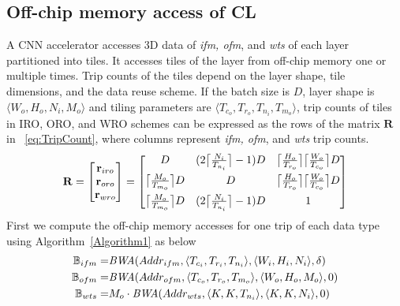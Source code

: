\subsection{Off-chip memory access of CL}\label{sec:AccessCLData}
A CNN accelerator accesses 3D data of \textit{ifm, ofm}, and \textit{wts} of each layer partitioned into tiles. It accesses tiles of the layer from off-chip memory one or multiple times. Trip counts of the tiles depend on the layer shape, tile dimensions, and the data reuse scheme. If the batch size is $D$, layer shape is $\langle W_o,H_o,N_i,M_o\rangle$ and tiling parameters are $\langle T_{c_o},T_{r_o},T_{n_i},T_{m_o}\rangle$, trip counts of tiles in IRO, ORO, and WRO schemes can be expressed as the rows of the matrix $\mathbf{R}$ in ~\eqref{eq:TripCount}, where columns represent \textit{ifm, ofm}, and \textit{wts} trip counts.
\begin{align}\label{eq:TripCount}
	\mathbf{R}=
	\begin{bmatrix}
		\mathbf{r}_{iro} \\  \mathbf{r}_{oro} \\ \mathbf{r}_{wro} \\
	\end{bmatrix}=
	\begin{bmatrix}
		D&(2\ceil[\big]{\frac{N_i}{T_{n_i}}}-1)D&\ceil[\big]{\frac{H_o}{T_{r_o}}}\ceil[\big]{\frac{W_o}{T_{c_o}}}D\\[6pt]
		\ceil[\big]{\frac{M_o}{T_{m_o}}}D&D&\ceil[\big]{\frac{H_o}{T_{r_o}}}\ceil[\big]{\frac{W_o}{T_{c_o}}} D\\[6pt]
		\ceil[\big]{\frac{M_o}{T_{m_o}}}D&(2\ceil[\big]{\frac{N_i}{T_{n_i}}}-1)D&1\\
	\end{bmatrix}
\end{align}
First we compute the off-chip memory accesses for one trip of each data type using Algorithm~\ref{Algorithm1} as below
\begin{align*}
	\begin{split}
		\numBytesOffChip_{ifm}=&\emph{BWA}(\addressSym_{ifm},\langle T_{c_i}, T_{r_i},T_{n_i}\rangle,\langle W_i,H_i,N_i\rangle,\numOverlap)\\
		\numBytesOffChip_{ofm}=&\emph{BWA}(\addressSym_{ofm},\langle T_{c_o},T_{r_o},T_{m_o}\rangle,\langle W_o,H_o,M_o\rangle,0)\\
		\numBytesOffChip_{wts}=&M_o\cdot \emph{BWA}(\addressSym_{wts},\langle K,K,T_{n_i}\rangle,\langle K,K,N_i\rangle,0)
	\end{split}
\end{align*} 
